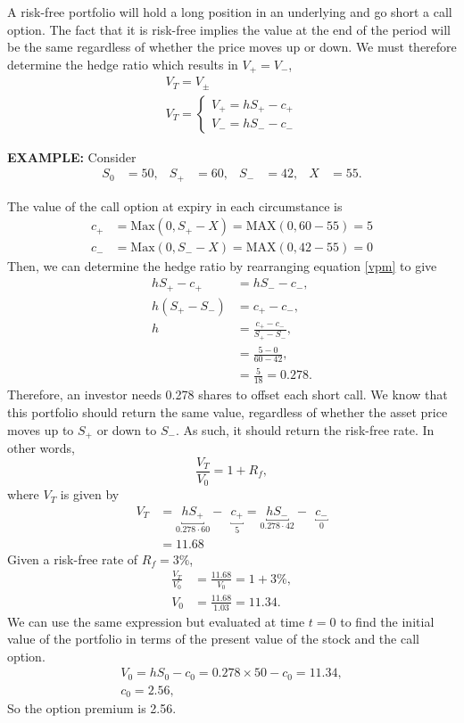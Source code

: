 \documentclass[../notes_compiled.tex]{subfiles}
\begin{document}
\begin{itemize}
\item A risk-free portfolio will hold a long position in an underlying and go short a call option. The fact that it is risk-free implies the value at the end of the period will be the same regardless of whether the price moves up or down. We must therefore determine the hedge ratio which results in $V_{+} = V_{-}$,
\begin{gather}
V_{T} = V_{\pm} \\
V_{T} = \begin{cases}V_{+}=hS_{+} - c_{+} \\ V_{-}=hS_{-}-c_{-}\end{cases} \label{vpm}
\end{gather}
{\color{RedViolet}
\item[] \textbf{EXAMPLE:} Consider
\begin{align*}
S_{0}&=50, & S_{+}&=60, & S_{-}&=42, & X&=55.
\end{align*}
}
{\color{RoyalBlue}
The value of the call option at expiry in each circumstance is
\begin{align*}
c_{+}&=\text{Max}(0,S_{+}-X)=\text{MAX}(0, 60-55)=5 \\
c_{-}&=\text{Max}(0,S_{-}-X)=\text{MAX}(0, 42-55)=0
\end{align*}
Then, we can determine the hedge ratio by rearranging equation \ref{vpm} to give
\begin{align*}
hS_{+} - c_{+} &=hS_{-}-c_{-}, \\
h(S_{+} - S_{-})&=c_{+} - c_{-}, \\
h&=\frac{c_{+}-c_{-}}{S_{+}-S_{-}}, \\
&=\frac{5-0}{60-42}, \\
&= \frac{5}{18} = 0.278.
\end{align*}
Therefore, an investor needs 0.278 shares to offset each short call. We know that this portfolio should return the same value, regardless of whether the asset price moves up to $S_{+}$ or down to $S_{-}$. As such, it should return the risk-free rate. In other words,
\begin{equation*}
\frac{V_{T}}{V_{0}}=1+R_{f},
\end{equation*}
where $V_{T}$ is given by 
\begin{align*}
V_{T} &=\underbracket{hS_{+}}_{0.278\cdot60}-\phantom{,}\underbracket{c_{+}}_{5} = \underbracket{hS_{-}}_{0.278\cdot42}-\phantom{,}\underbracket{c_{-}}_{0} \\
&=11.68
\end{align*}
Given a risk-free rate of $R_{f}=3\%$, 
\begin{align*}
\frac{V_{T}}{V_{0}} &= \frac{11.68}{V_{0}} = 1+3\%, \\
V_{0}&=\frac{11.68}{1.03}=11.34.
\end{align*}
We can use the same expression but evaluated at time $t=0$ to find the initial value of the portfolio in terms of the present value of the stock and the call option.
\begin{gather*}
V_{0}=hS_{0}-c_{0} = 0.278\times50 - c_{0} = 11.34, \\
c_{0}=2.56,
\end{gather*}
So the option premium is 2.56.
}


\end{itemize}
\end{document}
